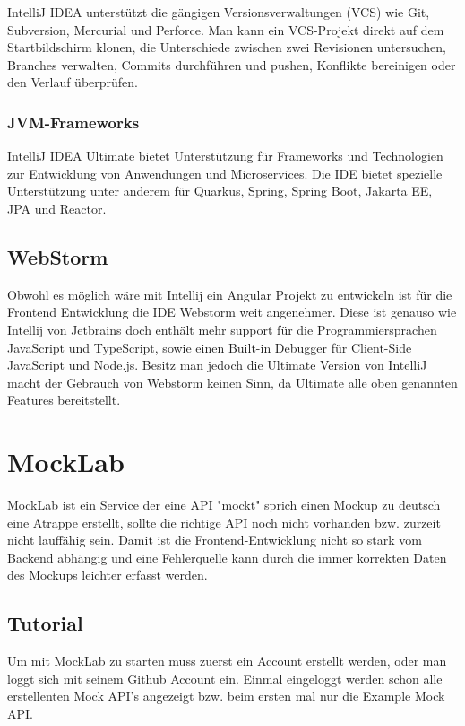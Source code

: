 IntelliJ IDEA unterstützt die gängigen Versionsverwaltungen (VCS) wie Git, Subversion, Mercurial und Perforce. 
Man kann ein VCS-Projekt direkt auf dem Startbildschirm klonen, die Unterschiede zwischen zwei Revisionen untersuchen, Branches verwalten, 
Commits durchführen und pushen, Konflikte bereinigen oder den Verlauf überprüfen. 
\cite{sysarch-intellij-1}


\subsubsection{JVM-Frameworks}

IntelliJ IDEA Ultimate bietet Unterstützung für Frameworks und Technologien zur Entwicklung von Anwendungen und Microservices. 
Die IDE bietet spezielle Unterstützung unter anderem für Quarkus, Spring, Spring Boot, Jakarta EE, JPA und Reactor.
\cite{sysarch-intellij-1}


\subsection{WebStorm}


Obwohl es möglich wäre mit Intellij ein Angular Projekt zu entwickeln ist für die Frontend Entwicklung 
die IDE Webstorm weit angenehmer. Diese ist genauso wie Intellij von Jetbrains doch enthält mehr support für die 
Programmiersprachen JavaScript und TypeScript, sowie einen Built-in Debugger für Client-Side JavaScript und Node.js.
Besitz man jedoch die Ultimate Version von IntelliJ macht der Gebrauch von Webstorm keinen Sinn, da Ultimate alle
oben genannten Features bereitstellt.
\cite{sysarch-webstorm-1}
\cite{sysarch-webstorm-2}

\section{MockLab}

MockLab ist ein Service der eine API "mockt" sprich einen Mockup zu deutsch eine Atrappe erstellt, sollte die richtige API noch nicht vorhanden bzw. zurzeit nicht lauffähig sein.
Damit ist die Frontend-Entwicklung nicht so stark vom Backend abhängig und eine Fehlerquelle kann durch die immer korrekten Daten des Mockups leichter erfasst werden.
\cite{sysarch-mocklab-1} 

\subsection{Tutorial}
Um mit MockLab zu starten muss zuerst ein Account erstellt werden, oder man loggt sich mit seinem Github Account ein.
Einmal eingeloggt werden schon alle erstellenten Mock API's angezeigt bzw. beim ersten mal nur die Example Mock API.

